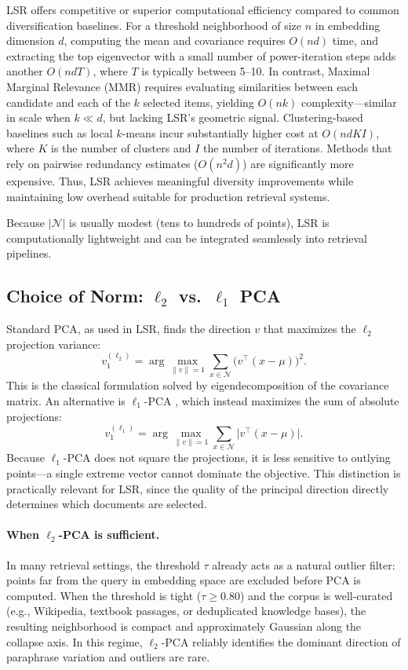 \documentclass{article}
\begin{document}
LSR offers competitive or superior computational efficiency compared to common diversification baselines. For a threshold neighborhood of size $n$ in embedding dimension $d$, computing the mean and covariance requires $O(nd)$ time, and extracting the top eigenvector with a small number of power-iteration steps adds another $O(ndT)$, where $T$ is typically between 5--10. In contrast, Maximal Marginal Relevance (MMR) requires evaluating similarities between each candidate and each of the $k$ selected items, yielding $O(nk)$ complexity---similar in scale when $k \ll d$, but lacking LSR's geometric signal. Clustering-based baselines such as local $k$-means incur substantially higher cost at $O(ndKI)$, where $K$ is the number of clusters and $I$ the number of iterations. Methods that rely on pairwise redundancy estimates ($O(n^2 d)$) are significantly more expensive. Thus, LSR achieves meaningful diversity improvements while maintaining low overhead suitable for production retrieval systems.

Because $|\mathcal{N}|$ is usually modest (tens to hundreds of points), LSR is computationally lightweight and can be integrated seamlessly into retrieval pipelines.

\subsection{Choice of Norm: $\ell_2$ vs.\ $\ell_1$ PCA}
\label{sec:l1-vs-l2}

Standard PCA, as used in LSR, finds the direction $v$ that maximizes the $\ell_2$ projection variance:
\begin{equation}
    v_1^{(\ell_2)} = \arg\max_{\|v\|=1} \sum_{x \in \mathcal{N}} \bigl(v^\top (x - \mu)\bigr)^2.
\end{equation}
This is the classical formulation solved by eigendecomposition of the covariance matrix. An alternative is $\ell_1$-PCA \cite{kwak2008l1pca}, which instead maximizes the sum of absolute projections:
\begin{equation}
    v_1^{(\ell_1)} = \arg\max_{\|v\|=1} \sum_{x \in \mathcal{N}} \bigl|v^\top (x - \mu)\bigr|.
\end{equation}
Because $\ell_1$-PCA does not square the projections, it is less sensitive to outlying points---a single extreme vector cannot dominate the objective. This distinction is practically relevant for LSR, since the quality of the principal direction directly determines which documents are selected.

\paragraph{When $\ell_2$-PCA is sufficient.}
In many retrieval settings, the threshold $\tau$ already acts as a natural outlier filter: points far from the query in embedding space are excluded before PCA is computed. When the threshold is tight ($\tau \geq 0.80$) and the corpus is well-curated (e.g., Wikipedia, textbook passages, or deduplicated knowledge bases), the resulting neighborhood is compact and approximately Gaussian along the collapse axis. In this regime, $\ell_2$-PCA reliably identifies the dominant direction of paraphrase variation and outliers are rare.
\end{document}
